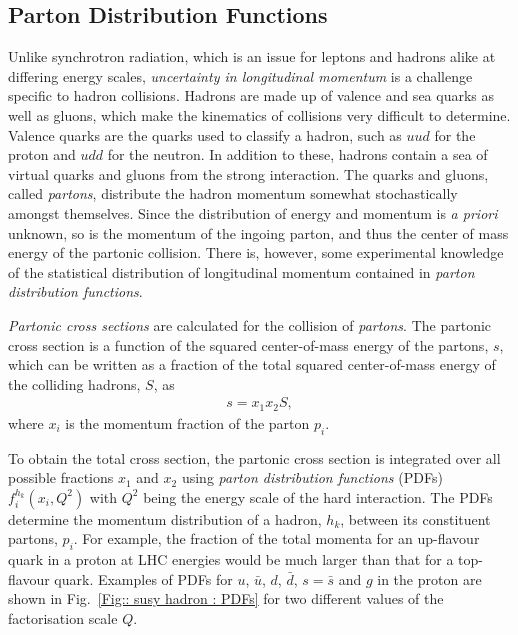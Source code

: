 \documentclass[twoside,english]{uiofysmaster}
\begin{document}
{\subsection{Parton Distribution Functions}\label{Sec:: susy hadron : Parton Distribution Functions}

Unlike synchrotron radiation, which is an issue for leptons and hadrons alike at differing energy scales, \textit{uncertainty in longitudinal momentum} is a challenge specific to hadron collisions. Hadrons are made up of valence and sea quarks as well as gluons, which make the kinematics of collisions very difficult to determine. Valence quarks are the quarks used to classify a hadron, such as $uud$ for the proton and $udd$ for the neutron. In addition to these, hadrons contain a sea of virtual quarks and gluons from the strong interaction. The quarks and gluons, called \textit{partons}, distribute the hadron momentum somewhat stochastically amongst themselves. Since the distribution of energy and momentum is \textit{a priori} unknown, so is the momentum of the ingoing parton, and thus the center of mass energy of the partonic collision. There is, however, some experimental knowledge of the statistical distribution of longitudinal momentum contained in \textit{parton distribution functions}.

\textit{Partonic cross sections} are calculated for the collision of \textit{partons}. The partonic cross section is a function of the squared center-of-mass energy of the partons, $s$, which can be written as a fraction of the total squared center-of-mass energy of the colliding hadrons, $S$, as
\begin{align}
s = x_1 x_2 S,
\end{align}
where $x_i$ is the momentum fraction of the parton $p_i$. 

To obtain the total cross section, the partonic cross section is integrated over all possible fractions $x_1$ and $x_2$ using \textit{parton distribution functions} (PDFs) $f_i^{h_k}(x_i, Q^2)$ with $Q^2$ being the energy scale of the hard interaction. The PDFs determine the momentum distribution of a hadron, $h_k$, between its constituent partons, $p_i$. For example, the fraction of the total momenta for an up-flavour quark in a proton at LHC energies would be much larger than that for a top-flavour quark. Examples of PDFs for $u$, $\bar{u}$, $d$, $\bar{d}$, $s=\bar{s}$ and $g$ in the proton are shown in Fig.~\ref{Fig:: susy hadron : PDFs} for two different values of the factorisation scale $Q$. 

}
\end{document}
